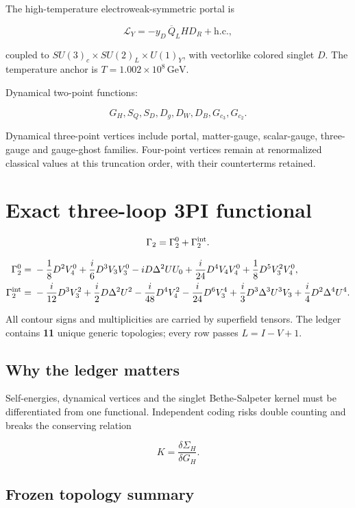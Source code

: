 \documentclass[
  10pt,
]{article}
\begin{document}
The high-temperature electroweak-symmetric portal is

\[
\mathcal L_Y=-y_D\,\overline Q_L H D_R+\mathrm{h.c.},
\]

coupled to \(SU(3)_c\times SU(2)_L\times U(1)_Y\), with vectorlike
colored singlet \(D\). The temperature anchor is
\(T=1.002\times10^8\,\mathrm{GeV}\).

Dynamical two-point functions:

\[
G_H,S_Q,S_D,D_g,D_W,D_B,G_{c_3},G_{c_2}.
\]

Dynamical three-point vertices include portal, matter-gauge,
scalar-gauge, three-gauge and gauge-ghost families. Four-point vertices
remain at renormalized classical values at this truncation order, with
their counterterms retained.

\section{Exact three-loop 3PI
functional}\label{exact-three-loop-3pi-functional}

\[
\Gamma_2=\Gamma_2^0+\Gamma_2^{\rm int}.
\]

\[
\begin{aligned}
\Gamma_2^0={}&-\frac18D^2V_4^0+\frac{i}{6}D^3V_3V_3^0-iD\Delta^2UU_0
+\frac{i}{24}D^4V_4V_4^0+\frac18D^5V_3^2V_4^0,\\
\Gamma_2^{\rm int}={}&-\frac{i}{12}D^3V_3^2+\frac{i}{2}D\Delta^2U^2-\frac{i}{48}D^4V_4^2
-\frac{i}{24}D^6V_3^4+\frac{i}{3}D^3\Delta^3U^3V_3+\frac{i}{4}D^2\Delta^4U^4.
\end{aligned}
\]

All contour signs and multiplicities are carried by superfield tensors.
The ledger contains \textbf{11} unique generic topologies; every row
passes \(L=I-V+1\).

\subsection{Why the ledger matters}\label{why-the-ledger-matters}

Self-energies, dynamical vertices and the singlet Bethe-Salpeter kernel
must be differentiated from one functional. Independent coding risks
double counting and breaks the conserving relation

\[
K=\frac{\delta\Sigma_H}{\delta G_H}.
\]

\subsection{Frozen topology summary}\label{frozen-topology-summary}
\end{document}
